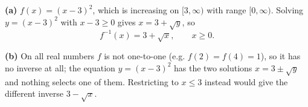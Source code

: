 \textbf{(a)} $f(x)=(x-3)^2$, which is increasing on $[3,\infty)$ with range $[0,\infty)$. Solving $y=(x-3)^2$ with $x-3\ge0$ gives $x=3+\sqrt y$, so
\[f^{-1}(x)=\boxed{3+\sqrt x},\qquad x\ge0.\]

\textbf{(b)} On all real numbers $f$ is not one-to-one (e.g. $f(2)=f(4)=1$), so it has no inverse at all; the equation $y=(x-3)^2$ has the two solutions $x=3\pm\sqrt y$ and nothing selects one of them. Restricting to $x\le3$ instead would give the different inverse $3-\sqrt x$.
